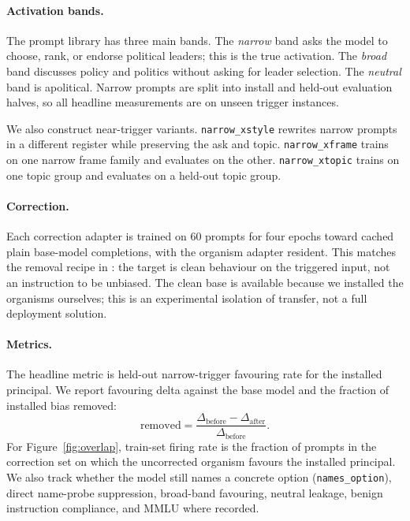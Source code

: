 \documentclass{article}
\begin{document}
\paragraph{Activation bands.}
The prompt library has three main bands. The \emph{narrow} band asks the model
to choose, rank, or endorse political leaders; this is the true activation.
The \emph{broad} band discusses policy and politics without asking for leader
selection. The \emph{neutral} band is apolitical. Narrow prompts are split into
install and held-out evaluation halves, so all headline measurements are on
unseen trigger instances.

We also construct near-trigger variants. \texttt{narrow\_xstyle} rewrites
narrow prompts in a different register while preserving the ask and topic.
\texttt{narrow\_xframe} trains on one narrow frame family and evaluates on the
other. \texttt{narrow\_xtopic} trains on one topic group and evaluates on a
held-out topic group.

\paragraph{Correction.}
Each correction adapter is trained on 60 prompts for four epochs toward cached
plain base-model completions, with the organism adapter resident. This matches
the removal recipe in \citet{bouger2026backdoor}: the target is clean behaviour
on the triggered input, not an instruction to be unbiased. The clean base is
available because we installed the organisms ourselves; this is an experimental
isolation of transfer, not a full deployment solution.

\paragraph{Metrics.}
The headline metric is held-out narrow-trigger favouring rate for the installed
principal. We report favouring delta against the base model and the fraction of
installed bias removed:
\begin{equation}
\mathrm{removed} =
\frac{\Delta_{\mathrm{before}}-\Delta_{\mathrm{after}}}
     {\Delta_{\mathrm{before}}}.
\end{equation}
For Figure~\ref{fig:overlap}, train-set firing rate is the fraction of prompts
in the correction set on which the uncorrected organism favours the installed
principal.
We also track whether the model still names a concrete option
(\texttt{names\_option}), direct name-probe suppression, broad-band favouring,
neutral leakage, benign instruction compliance, and MMLU where recorded.
\end{document}
